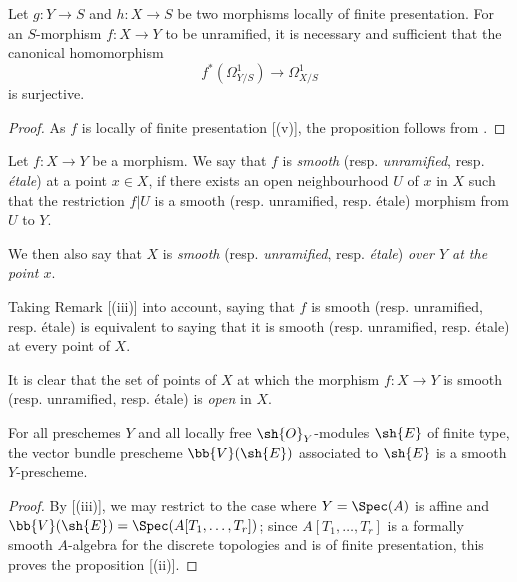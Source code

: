 \begin{proposition}[17.3.6]
\label{IV.17.3.6}
Let $g:Y\to S$ and $h:X\to S$ be two morphisms locally of finite presentation.
For an $S$-morphism $f:X\to Y$ to be unramified, it is necessary and sufficient that the canonical homomorphism 
\[
  f^*(\Omega_{Y/S}^1)\to\Omega_{X/S}^1
\]
is surjective.
\end{proposition}

\begin{proof}
As $f$ is locally of finite presentation [(v)], the proposition follows from .
\end{proof}

\begin{definition}[17.3.7]
\label{IV.17.3.7}
Let $f:X\to Y$ be a morphism.
We say that $f$ is \emph{smooth} (resp. \emph{unramified}, resp. \emph{\'etale}) at a point $x\in X$, if there exists an open neighbourhood $U$ of $x$ in $X$ such that the restriction $f|U$ is a smooth (resp. unramified, resp. \'etale) morphism from $U$ to $Y$.
\end{definition}

We then also say that $X$ is \emph{smooth} (resp. \emph{unramified}, resp. \emph{\'etale}) \emph{over $Y$ at the point $x$}.

Taking Remark [(iii)] into account, saying that $f$ is smooth (resp. unramified, resp. \'etale) is equivalent to saying that it is smooth (resp. unramified, resp. \'etale) at every point of $X$.

It is clear that the set of points of $X$ at which the morphism $f:X\to Y$ is smooth (resp. unramified, resp. \'etale) is \emph{open} in $X$.

\begin{proposition}[17.3.8]
\label{IV.17.3.8}
For all preschemes $Y$ and all locally free $\sh{O}_Y$-modules $\sh{E}$ of finite type, the vector bundle prescheme $\bb{V}(\sh{E})$  associated to $\sh{E}$ is a smooth $Y$-prescheme.
\end{proposition}

\begin{proof}
By [(iii)], we may restrict to the case where $Y=\Spec(A)$ is affine and $\bb{V}(\sh{E})=\Spec(A[T_1,\dots,T_r])$;
since $A[T_1,\dots,T_r]$ is a formally smooth $A$-algebra for the discrete topologies  and is of finite presentation, this proves the proposition [(ii)].
\end{proof}

